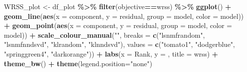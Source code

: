\documentclass[
]{article}
\newenvironment{Shaded}{\begin{snugshade}}{\end{snugshade}}
\newcommand{\AttributeTok}[1]{\textcolor[rgb]{0.13,0.29,0.53}{#1}}
\newcommand{\FunctionTok}[1]{\textcolor[rgb]{0.13,0.29,0.53}{\textbf{#1}}}
\newcommand{\NormalTok}[1]{#1}
\newcommand{\OtherTok}[1]{\textcolor[rgb]{0.56,0.35,0.01}{#1}}
\newcommand{\SpecialCharTok}[1]{\textcolor[rgb]{0.81,0.36,0.00}{\textbf{#1}}}
\newcommand{\StringTok}[1]{\textcolor[rgb]{0.31,0.60,0.02}{#1}}
\begin{document}
\begin{Shaded}
\begin{Highlighting}[]
\NormalTok{WRSS\_plot }\OtherTok{\textless{}{-}}\NormalTok{ df\_plot }\SpecialCharTok{\%\textgreater{}\%}
  \FunctionTok{filter}\NormalTok{(objective}\SpecialCharTok{==}\StringTok{\textquotesingle{}wrss\textquotesingle{}}\NormalTok{) }\SpecialCharTok{\%\textgreater{}\%}
  \FunctionTok{ggplot}\NormalTok{() }\SpecialCharTok{+}
  \FunctionTok{geom\_line}\NormalTok{(}\FunctionTok{aes}\NormalTok{(}\AttributeTok{x =}\NormalTok{ component, }\AttributeTok{y =}\NormalTok{ residual, }\AttributeTok{group =}\NormalTok{ model, }\AttributeTok{color =}\NormalTok{ model)) }\SpecialCharTok{+}
  \FunctionTok{geom\_point}\NormalTok{(}\FunctionTok{aes}\NormalTok{(}\AttributeTok{x =}\NormalTok{ component, }\AttributeTok{y =}\NormalTok{ residual, }\AttributeTok{group =}\NormalTok{ model, }\AttributeTok{color =}\NormalTok{ model)) }\SpecialCharTok{+}
  \FunctionTok{scale\_colour\_manual}\NormalTok{(}\StringTok{""}\NormalTok{, }
                  \AttributeTok{breaks =} \FunctionTok{c}\NormalTok{(}\StringTok{"lsnmfrandom"}\NormalTok{, }\StringTok{"lsnmfnndsvd"}\NormalTok{,}
                             \StringTok{"klrandom"}\NormalTok{, }\StringTok{"klnndsvd"}\NormalTok{),}
                  \AttributeTok{values =} \FunctionTok{c}\NormalTok{(}\StringTok{"tomato1"}\NormalTok{, }\StringTok{"dodgerblue"}\NormalTok{,}
                             \StringTok{"springgreen4"}\NormalTok{, }\StringTok{"darkorange"}\NormalTok{)) }\SpecialCharTok{+}
  \FunctionTok{labs}\NormalTok{(}\AttributeTok{x =} \StringTok{\textquotesingle{}Rank\textquotesingle{}}\NormalTok{, }\AttributeTok{y =} \StringTok{\textquotesingle{}\textquotesingle{}}\NormalTok{, }\AttributeTok{title =} \StringTok{\textquotesingle{}wrss\textquotesingle{}}\NormalTok{) }\SpecialCharTok{+}
  \FunctionTok{theme\_bw}\NormalTok{() }\SpecialCharTok{+}
  \FunctionTok{theme}\NormalTok{(}\AttributeTok{legend.position=}\StringTok{"none"}\NormalTok{)}


\end{Highlighting}
\end{Shaded}
\end{document}
